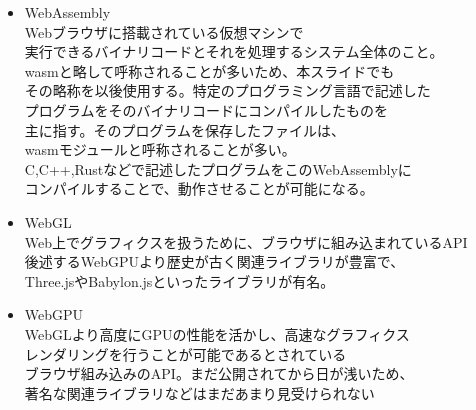 \begin{itemize}
	\item WebAssembly\\Webブラウザに搭載されている仮想マシンで\\実行できるバイナリコードとそれを処理するシステム全体\cite{WebAssembly}のこと。\\wasmと略して呼称されることが多いため、本スライドでも\\その略称を以後使用する。特定のプログラミング言語で記述した\\プログラムをそのバイナリコードにコンパイルしたものを\\主に指す。そのプログラムを保存したファイルは、\\wasmモジュールと呼称されることが多い。\\C,C++,Rustなどで記述したプログラムをこのWebAssemblyに\\コンパイルすることで、動作させることが可能になる。\cite{FromCompileLang}
	\newpage
	
	\item WebGL\\Web上でグラフィクスを扱うために、ブラウザに組み込まれているAPI\\後述するWebGPUより歴史が古く関連ライブラリが豊富で、\\Three.jsやBabylon.jsといったライブラリが有名。
	
	\item WebGPU\\WebGLより高度にGPUの性能を活かし、高速なグラフィクス\\レンダリングを行うことが可能であるとされている\\ブラウザ組み込みのAPI。まだ公開されてから日が浅いため、\\著名な関連ライブラリなどはまだあまり見受けられない
\end{itemize}
\newpage

